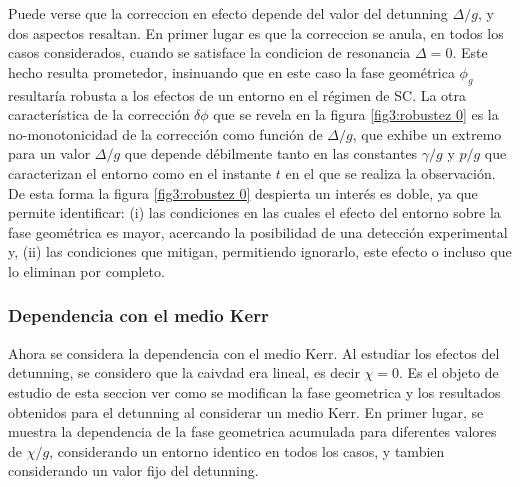 Puede verse que la correccion en efecto depende del valor del detunning $\Delta/g$, y dos aspectos resaltan. En primer lugar es que la correccion se anula, en todos los casos considerados, cuando se satisface la condicion de resonancia $\Delta=0$. Este hecho resulta prometedor,  insinuando que en este caso la fase geométrica $\phi_g$ resultaría robusta a los efectos de un entorno en el régimen de SC. La otra característica de la corrección $\delta\phi$ que se revela en la figura \ref{fig3:robustez 0} es la no-monotonicidad de la corrección como función de $\Delta/g$, que exhibe un extremo para un valor $\Delta/g$ que depende débilmente tanto en las constantes $\gamma/g$ y $p/g$ que caracterizan el entorno como en el instante $t$ en el que se realiza la observación. De esta forma la figura \ref{fig3:robustez 0} despierta un interés es doble, ya que permite identificar: (i) las condiciones en las cuales el efecto del entorno sobre la fase geométrica es mayor, acercando la posibilidad de una detección experimental y, (ii) las condiciones que mitigan, permitiendo ignorarlo, este efecto o incluso que lo eliminan por completo.

\subsubsection{Dependencia con el medio Kerr}

Ahora se considera la dependencia con el medio Kerr. Al estudiar los efectos del detunning, se considero que la caivdad era lineal, es decir $\chi=0$. Es el objeto de estudio de esta seccion ver como se modifican la fase geometrica y los resultados obtenidos para el detunning al considerar un medio Kerr. En primer lugar, se muestra la dependencia de la fase geometrica acumulada para diferentes valores de $\chi/g$, considerando un entorno identico en todos los casos, y tambien considerando un valor fijo del detunning.

